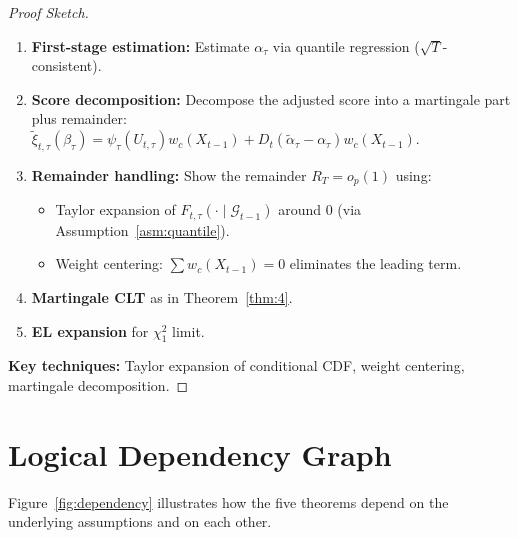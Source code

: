 \documentclass[11pt,a4paper]{article}
\theoremstyle{definition}
\theoremstyle{remark}
\begin{document}
\begin{proof}[Proof Sketch]
\begin{enumerate}[leftmargin=*, label=\textbf{\arabic*}.]
    \item \textbf{First-stage estimation:}
    Estimate $\alpha_\tau$ via quantile regression ($\sqrt{T}$-consistent).
    \item \textbf{Score decomposition:}
    Decompose the adjusted score into a martingale part plus remainder:
    $\widetilde{\xi}_{t,\tau}(\beta_\tau) = \psi_\tau(U_{t,\tau}) w_c(X_{t-1}) + D_t(\widetilde{\alpha}_\tau - \alpha_\tau) w_c(X_{t-1})$.
    \item \textbf{Remainder handling:}
    Show the remainder $R_T = o_p(1)$ using:
    \begin{itemize}
        \item Taylor expansion of $F_{t,\tau}(\cdot \mid \mathcal{G}_{t-1})$ around 0
        (via Assumption~\ref{asm:quantile}).
        \item Weight centering: $\sum w_c(X_{t-1}) = 0$ eliminates the leading term.
    \end{itemize}
    \item \textbf{Martingale CLT} as in Theorem~\ref{thm:4}.
    \item \textbf{EL expansion} for $\chi^2_1$ limit.
\end{enumerate}
\textbf{Key techniques:} Taylor expansion of conditional CDF, weight centering,
martingale decomposition.
\end{proof}

\section{Logical Dependency Graph}

Figure~\ref{fig:dependency} illustrates how the five theorems depend on the underlying
assumptions and on each other.
\end{document}
